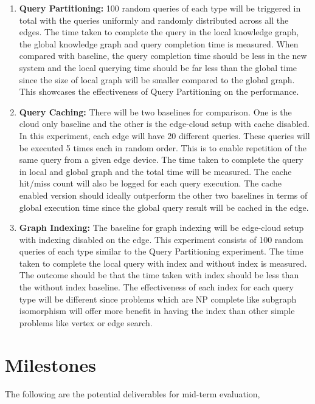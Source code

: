 \documentclass[conference]{IEEEtran}
\begin{document}
\begin{enumerate}%
	\item \textbf{Query Partitioning:} 100 random queries of each type will be triggered in total with the queries uniformly and randomly distributed across all the edges. The time taken to complete the query in the local knowledge graph, the global knowledge graph and query completion time is measured. When compared with baseline, the query completion time should be less in the new system and the local querying time should be far less than the global time since the size of local graph will be smaller compared to the global graph. This showcases the effectiveness of Query Partitioning on the performance.
    \item \textbf{Query Caching:} There will be two baselines for comparison. One is the cloud only baseline and the other is the edge-cloud setup with cache disabled. In this experiment, each edge will have 20 different queries. These queries will be executed 5 times each in random order. This is to enable repetition of the same query from a given edge device. The time taken to complete the query in local and global graph and the total time will be measured. The cache hit/miss count will also be logged for each query execution. The cache enabled version should ideally outperform the other two baselines in terms of global execution time since the global query result will be cached in the edge.
    \item \textbf{Graph Indexing:} The baseline for graph indexing will be edge-cloud setup with indexing disabled on the edge. This experiment consists of 100 random queries of each type similar to the Query Partitioning experiment. The time taken to complete the local query with index and without index is measured. The outcome should be that the time taken with index should be less than the without index baseline. The effectiveness of each index for each query type will be different since problems which are NP complete like subgraph isomorphism will offer more benefit in having the index than other simple problems like vertex or edge search.
\end{enumerate}

\section{Milestones}

The following are the potential deliverables for mid-term evaluation,
\end{document}
